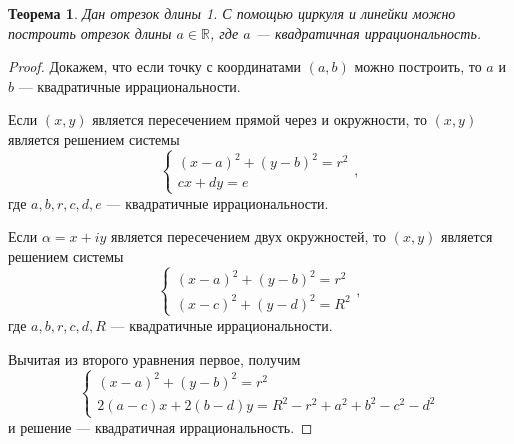 \documentclass[a4paper]{article}
\newcommand{\R}{\ensuremath{\mathbb{R}}}
\newtheorem{theorem}{Теорема}
\numberwithin{theorem}{section}
\numberwithin{lemma}{section}
\numberwithin{proposition}{section}
\numberwithin{corollary}{section}
\begin{document}
\begin{theorem}
Дан отрезок длины 1. С помощью циркуля и линейки можно построить отрезок длины $a \in \R$, где $a$ --- квадратичная иррациональность.
\end{theorem}
\begin{proof}
Докажем, что если точку с координатами $(a, b)$ можно построить,
то $a$ и $b$ --- квадратичные иррациональности.

\begin{minipage}{0.15\linewidth}
\end{minipage}
\begin{minipage}{0.8\linewidth}
Если $(x, y)$ является пересечением прямой через и окружности,
то $(x, y)$ является решением системы
\[
    \begin{cases}
        (x - a)^2 + (y - b)^2 = r^2 \\
        cx+dy = e
    \end{cases},
\]
где $a, b, r, c,d,e$ --- квадратичные иррациональности.
\end{minipage}

\begin{minipage}{0.75\linewidth}
Если $\alpha = x + iy$ является пересечением двух окружностей,
то $(x, y)$ является решением системы
\[
    \begin{cases}
        (x - a)^2 + (y - b)^2 = r^2 \\
        (x - c)^2 + (y - d)^2 = R^2
    \end{cases},
\]
где $a, b, r, c, d, R$ --- квадратичные иррациональности.
\end{minipage}
\begin{minipage}{0.1\linewidth}
\end{minipage}
Вычитая из второго уравнения первое, получим
\[
    \begin{cases}
        (x - a)^2 + (y - b)^2 = r^2 \\
        2(a - c)x + 2(b - d)y = R^2 - r^2 + a^2 + b^2 -c^2-d^2
    \end{cases}
\]
и решение --- квадратичная иррациональность.
\end{proof}

\newpage
\end{document}
